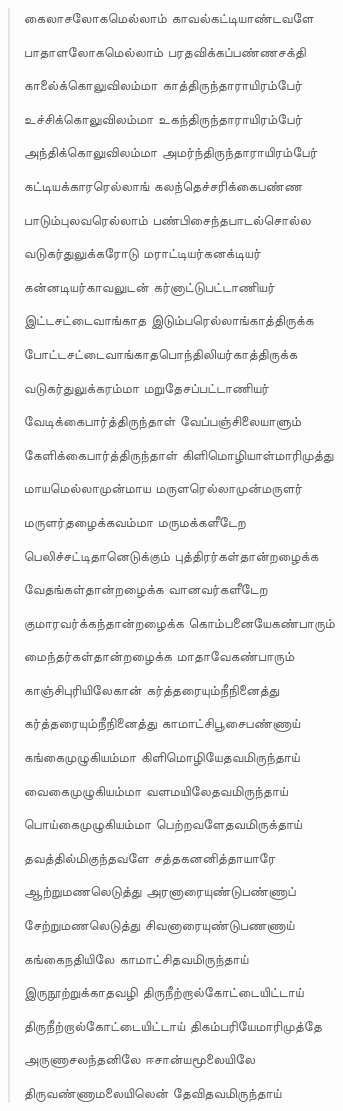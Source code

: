 \documentclass{article}
\begin{document}
\begin{quotation}
{கைலாசலோகமெல்லாம் காவல்கட்டியாண்டவளே

பாதாளலோகமெல்லாம் பரதவிக்கப்பண்ணசக்தி

காலை்க்கொலுவிலம்மா காத்திருந்தாராயிரம்பேர்

உச்சிக்கொலுவிலம்மா உகந்திருந்தாராயிரம்பேர்

அந்திக்கொலுவிலம்மா அமர்ந்திருந்தாராயிரம்பேர்

கட்டியக்காரரெல்லாங் கலந்தெச்சரிக்கைபண்ண

பாடும்புலவரெல்லாம் பண்பிசைந்தபாடல்சொல்ல

வடுகர்துலுக்கரோடு மராட்டியர்கனக்டியர்

கன்னடியர்காவலுடன் கர்னாட்டுபட்டாணியர்

இட்டசட்டைவாங்காத இடும்பரெல்லாங்காத்திருக்க

போட்டசட்டைவாங்காதபொந்திலியர்காத்திருக்க

வடுகர்துலுக்கரம்மா மறுதேசப்பட்டாணியர்

வேடிக்கைபார்த்திருந்தாள் வேப்பஞ்சிலையாளும்

கேளிக்கைபார்த்திருந்தாள் கிளிமொழியாள்மாரிமுத்து

மாயமெல்லாமுன்மாய மருளரெல்லாமுன்மருளர்

மருளர்தழைக்கவம்மா மருமக்களீடேற

பெலிச்சட்டிதானெடுக்கும் புத்திரர்கள்தான்றழைக்க

வேதங்கள்தான்றழைக்க வானவர்களீடேற

குமாரவர்க்கந்தான்றழைக்க கொம்பனையேகண்பாரும்

மைந்தர்கள்தான்றழைக்க மாதாவேகண்பாரும்

காஞ்சிபுரியிலேகான் கர்த்தரையும்நீநினைத்து

கர்த்தரையும்நீநினைத்து காமாட்சிபூசைபண்ணாய்

கங்கைமுழுகியம்மா கிளிமொழியேதவமிருந்தாய்

வைகைமுழுகியம்மா வளமயிலேதவமிருந்தாய்

பொய்கைமுழுகியம்மா பெற்றவளேதவமிருக்தாய்‌

தவத்தில்மிகுந்தவளே சத்தகனனித்தாயாரே

ஆற்றுமணலெடுத்து அரனாரையுண்டுபண்ணாப்

சேற்றுமணலெடுத்து சிவனாரையுண்டுபணணாய்

கங்கைநதியிலே காமாட்சிதவமிருந்தாய்

இருநூற்றுக்காதவழி திருநீற்றால்கோட்டையிட்டாய்

திருநீற்றால்கோட்டையிட்டாய் திகம்பரியேமாரிமுத்தே

அருணாசலந்தனிலே ஈசான்யமூலையிலே

திருவண்ணாமலையிலென் தேவிதவமிருந்தாய்

}
\end{quotation}
\end{document}
